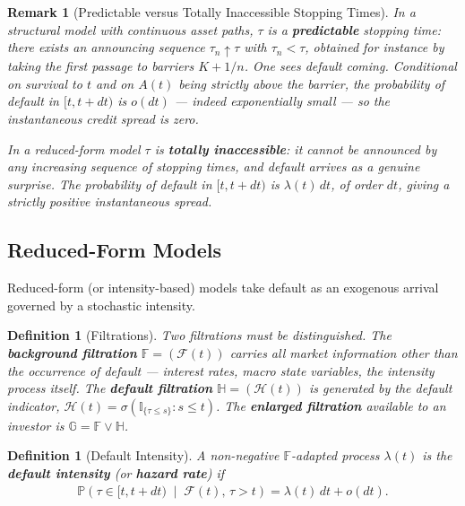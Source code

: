 \documentclass{report}
\theoremstyle{spacedplain}
\theoremstyle{spaceddefinition}
\newtheorem{definition}[theorem]{Definition}
\theoremstyle{spacedremark}
\newtheorem{remark}[theorem]{Remark}
\begin{document}
\begin{remark}[Predictable versus Totally Inaccessible Stopping Times]\label{rmk:accessible}
    In a structural model with continuous asset paths, $\tau$ is a \textbf{predictable} stopping time: there exists an announcing sequence $\tau_n \uparrow \tau$ with $\tau_n < \tau$, obtained for instance by taking the first passage to barriers $K+1/n$. One sees default coming. Conditional on survival to $t$ and on $A(t)$ being strictly above the barrier, the probability of default in $[t,t+dt)$ is $o(dt)$ --- indeed exponentially small --- so the instantaneous credit spread is zero.

    In a reduced-form model $\tau$ is \textbf{totally inaccessible}: it cannot be announced by any increasing sequence of stopping times, and default arrives as a genuine surprise. The probability of default in $[t,t+dt)$ is $\lambda(t)\,dt$, of order $dt$, giving a strictly positive instantaneous spread.
\end{remark}

\subsection{Reduced-Form Models}

Reduced-form (or intensity-based) models take default as an exogenous arrival governed by a stochastic intensity.

\begin{definition}[Filtrations]
    Two filtrations must be distinguished. The \textbf{background filtration} $\mathbb{F} = (\mathcal{F}(t))$ carries all market information \emph{other} than the occurrence of default --- interest rates, macro state variables, the intensity process itself. The \textbf{default filtration} $\mathbb{H} = (\mathcal{H}(t))$ is generated by the default indicator, $\mathcal{H}(t) = \sigma(\mathbb{I}_{\{\tau\leq s\}} : s \leq t)$. The \textbf{enlarged filtration} available to an investor is $\mathbb{G} = \mathbb{F}\vee\mathbb{H}$.
\end{definition}

\begin{definition}[Default Intensity]
    A non-negative $\mathbb{F}$-adapted process $\lambda(t)$ is the \textbf{default intensity} (or \textbf{hazard rate}) if
    \begin{align}
        \mathbb{P}\!\left(\tau \in [t,t+dt) \;\middle|\; \mathcal{F}(t),\, \tau > t\right) = \lambda(t)\,dt + o(dt).
    \end{align}
\end{definition}
\end{document}
